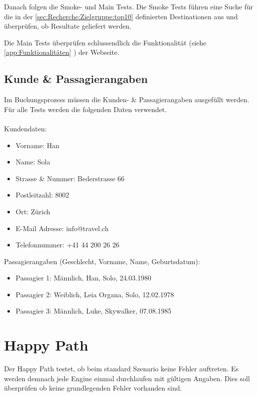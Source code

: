 Danach folgen die Smoke- und Main Tests. Die Smoke Tests führen eine Suche für die in der \cref{sec:Recherche:Zielgruppe:top10}  definierten Destinationen aus und überprüfen, ob Resultate geliefert werden.

Die Main Tests überprüfen schlussendlich die Funktionalität (siehe \cref{app:Funktionalitäten} ) der Webseite.

\subsection{Kunde \& Passagierangaben}
\label{sec:Konzept:Übersicht:Angaben}
Im Buchungsprozess müssen die Kunden- \& Passagierangaben ausgefüllt werden. Für alle Tests werden die folgenden Daten verwendet.
 \\
 \\
Kundendaten:
\begin{itemize}
\item Vorname: Han
\item Name: Sola
\item Strasse \& Nummer: Bederstrasse 66
\item Postleitzahl: 8002
\item Ort: Zürich
\item E-Mail Adresse: info@travel.ch
\item Telefonnummer: +41 44 200 26 26 
\end{itemize}

Passagierangaben (Geschlecht, Vorname, Name, Geburtsdatum):
\begin{itemize}
\item Passagier 1: Männlich, Han, Solo, 24.03.1980
\item Passagier 2: Weiblich, Leia Organa, Solo, 12.02.1978
\item Passagier 3: Männlich, Luke, Skywalker, 07.08.1985
\end{itemize}

\section{Happy Path}
Der Happy Path testet, ob beim standard Szenario keine Fehler auftreten. Es werden demnach jede Engine einmal durchlaufen mit gültigen Angaben. Dies soll überprüfen ob keine grundlegenden Fehler vorhanden sind.
